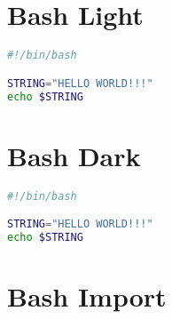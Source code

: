 \section{Bash Light}

\begin{lstlisting}[language=bash, style=customStyleBashLight, caption=Snippet title]
#!/bin/bash

STRING="HELLO WORLD!!!"
echo $STRING
\end{lstlisting}

\section{Bash Dark}

\begin{lstlisting}[language=bash, style=customStyleBashDark, caption=Snippet title]
#!/bin/bash

STRING="HELLO WORLD!!!"
echo $STRING
\end{lstlisting}

\section{Bash Import}




